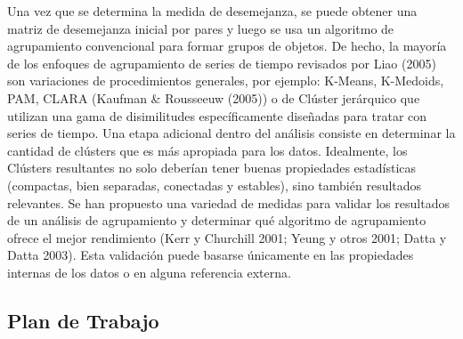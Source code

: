 \documentclass[10pt,a5paper]{article}
\begin{document}
Una vez que se determina la medida de desemejanza, se puede obtener una matriz de desemejanza inicial por pares y luego se usa un algoritmo de agrupamiento convencional para formar grupos de objetos. De hecho, la mayoría de los enfoques de agrupamiento de series de tiempo revisados por Liao (2005) son variaciones de procedimientos generales, por ejemplo: K-Means, K-Medoids, PAM, CLARA (Kaufman \& Rousseeuw (2005)) o de Clúster jerárquico que utilizan una gama de disimilitudes específicamente diseñadas para tratar con series de tiempo. 
Una etapa adicional dentro del análisis consiste en determinar la cantidad de clústers que es más apropiada para los datos. Idealmente, los Clústers resultantes no solo deberían tener buenas propiedades estadísticas (compactas, bien separadas, conectadas y estables), sino también resultados relevantes. Se han propuesto una variedad de medidas para validar los resultados de un análisis de agrupamiento y determinar qué algoritmo de agrupamiento ofrece el mejor rendimiento  (Kerr y Churchill 2001; Yeung y otros 2001; Datta y Datta 2003). Esta validación puede basarse únicamente en las propiedades internas de los datos o en alguna referencia externa.

\subsection{Plan de Trabajo}
\end{document}
